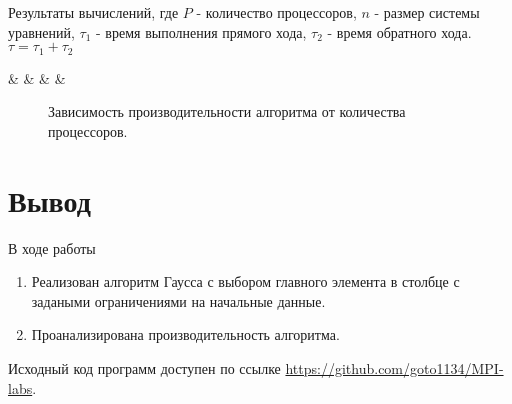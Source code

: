 		
			\begin{table}
				\centering
				\caption{Результаты вычислений, где $ P $ - количество процессоров, $ n $ - размер системы уравнений, $ \tau_1 $ - время выполнения прямого хода, $ \tau_2 $ - время обратного хода. $ \tau = \tau_1 + \tau_2 $}
				\label{t1}
				{\thecsvrow & \pnumber& \n & \ftime & \stime}%
			\end{table}
			\begin{figure}
				\centering
				\caption{Зависимость производительности алгоритма от количества процессоров.} \label{fig:performance}
			\end{figure}
				
	\section{Вывод}
		В ходе работы
		\begin{enumerate}
			\item Реализован алгоритм Гаусса с выбором главного элемента в столбце с задаными ограничениями на начальные данные.
			\item Проанализирована производительность алгоритма.
		\end{enumerate}
	
		Исходный код программ доступен по ссылке \href{https://github.com/goto1134/MPI-labs}{https://github.com/goto1134/MPI-labs}.